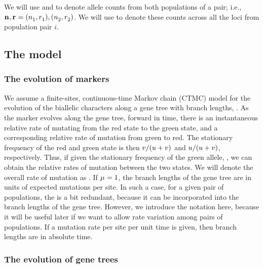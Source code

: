 We will use \leafallelecounts and \leafredallelecounts to denote allele counts
from both populations of a pair; i.e., 
$\leafallelecounts, \leafredallelecounts = (\allelecount[1], \redallelecount[1]), 
(\allelecount[2], \redallelecount[2])$.
We will use \comparisondata[i] to denote these counts across all the loci from
population pair $i$.


\subsection{The model}

\subsubsection{The evolution of markers}

We assume a finite-sites, continuous-time Markov chain (CTMC) model for the
evolution of the biallelic characters along a gene tree with branch lengths,
\genetree.
As the marker evolves along the gene tree, forward in time, there is an
instantaneous relative rate \rgmurate of mutating from the red state to the
green state, and a corresponding relative rate \grmurate of mutation from green
to red.
The stationary frequency of the red and green state is then
$\grmurate / (\rgmurate + \grmurate)$
and
$\rgmurate / (\rgmurate + \grmurate)$, respectively.
Thus, if given the stationary frequency of the green allele, \gfreq, we can
obtain the relative rates of mutation between the two states.
We will denote the overall rate of mutation as \murate.
If $\murate = 1$, the branch lengths of the gene tree are in units of expected
mutations per site.
In such a case, for a given pair of populations, the \murate is a bit
redundant, because it can be incorporated into the branch lengths of the gene
tree.
However, we introduce the notation here, because it will be useful later if we
want to allow rate variation among pairs of populations.
If a mutation rate per site per unit time is given, then branch lengths are in
absolute time.

\subsubsection{The evolution of gene trees}

